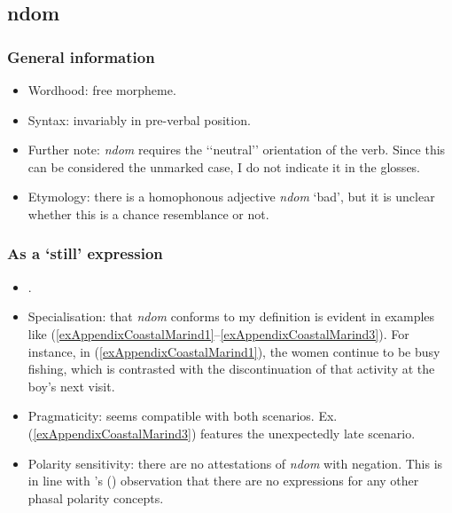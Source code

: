 \subsection{ndom}
\subsubsection{General information}
\begin{itemize}
	\item Wordhood: free morpheme.
	\item Syntax: invariably in pre-verbal position.
	\item Further note: \textit{ndom} requires the \lq\lq neutral\rq\rq{ }orientation of the verb. Since this can be considered the unmarked case, I do not indicate it in the glosses. 
	\item Etymology: there is a homophonous adjective \textit{ndom} \lq bad', but it is unclear whether this is a chance resemblance or not.
\end{itemize}

\subsubsection{As a \lq{}still\rq{ }expression}
\begin{itemize}
	\item \textcite[302, 525–526]{Olsson2017}.
	\item Specialisation: that \textit{ndom} conforms to my definition is evident in examples like (\ref{exAppendixCoastalMarind1}–\ref{exAppendixCoastalMarind3}). For instance, in (\ref{exAppendixCoastalMarind1}), the women continue to be busy fishing, which is contrasted with the discontinuation of that activity at the boy's next visit.
	\item Pragmaticity:  seems compatible with both scenarios. Ex. (\ref{exAppendixCoastalMarind3}) features the unexpectedly late scenario.
	\item Polarity sensitivity: there are no attestations of \textit{ndom} with negation. This is in line with \citeauthor{Olsson2017}'s (\citeyear[525]{Olsson2017}) observation that there are no expressions for any other phasal polarity concepts.
\end{itemize}

